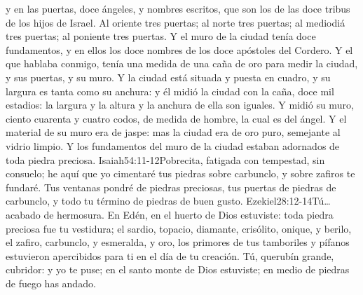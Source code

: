  y en las puertas, doce ángeles,%
 y nombres escritos, que son los de las doce tribus de los hijos de Israel.%
Al oriente tres puertas; al norte tres puertas; al mediodiá tres puertas; al poniente tres puertas.
Y el muro de la ciudad tenía doce fundamentos, y en ellos los doce nombres de los doce apóstoles del Cordero. 
Y el que hablaba conmigo, tenía una medida de una caña de oro para medir la ciudad, y sus puertas, y su muro.%
Y la ciudad está situada y puesta en cuadro, y su largura es tanta como su anchura:%
 y él midió la ciudad con la caña, doce mil estadios: la largura y la altura y la anchura de ella son iguales.%
Y midió su muro, ciento cuarenta y cuatro codos, de medida de hombre, la cual es del ángel. 
Y el material de su muro era de jaspe: mas la ciudad era de oro puro, semejante al vidrio limpio. 
Y los fundamentos del muro de la ciudad estaban adornados de toda piedra preciosa.%
				{Isaiah}{54:11-12}{Pobrecita, fatigada con tempestad, sin consuelo; he aquí que yo cimentaré tus piedras sobre carbunclo, y sobre zafiros te fundaré. Tus ventanas pondré de piedras preciosas, tus puertas de piedras de carbunclo, y todo tu término de piedras de buen gusto.}%
				{Ezekiel}{28:12-14}{Tú\ldots acabado de hermosura. En Edén, en el huerto de Dios estuviste: toda piedra preciosa fue tu vestidura; el sardio, topacio, diamante, crisólito, onique, y berilo, el zafiro, carbunclo, y esmeralda, y oro, los primores de tus tamboriles y pífanos estuvieron apercibidos para ti en el día de tu creación. Tú, querubín grande, cubridor: y yo te puse; en el santo monte de Dios estuviste; en medio de piedras de fuego has andado.} %
